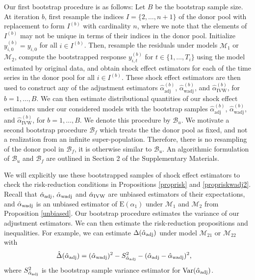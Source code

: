 \documentclass[11pt,3p,review,authoryear]{elsarticle}
\def\mrm#1{\mathrm{#1}} %
\def\mc#1{\mathcal{#1}} %
\def\E#1{\mathrm{E}(#1)} %
\DeclareMathOperator{\Var}{Var} %
\theoremstyle{definition}
\begin{document}
Our first bootstrap procedure is as follows: Let $B$ be the bootstrap sample size. At iteration $b$, first resample the indices $I = \{2, \ldots, n+1\}$ of the donor pool with replacement to form $I^{(b)}$ with cardinality $n$, where we note that the elements of $I^{(b)}$ may not be unique in terms of their  indices in the donor pool. Initialize $y_{i,0}^{(b)}=y_{i,0}$ for all $i \in I^{(b)}$. Then, resample the residuals under models $\mc{M}_1$ or $\mc{M}_{2}$, compute the bootstrapped response  $y_{i,t}^{(b)}$ for   $t \in \{1, \ldots, T_i\}$ using the model estimated by original data,  and obtain shock effect estimators for each of the time series in the donor pool for all $i \in I^{(b)}$. These shock effect estimators are then used to construct any of the adjustment estimators $\hat{\alpha}^{(b)}_{\mrm{adj}}$, $\hat{\alpha}^{(b)}_{\mrm{wadj}}$, and $\hat{\alpha}^{(b)}_{\mrm{IVW}}$, for $b = 1,\ldots,B$. We can then estimate distributional quantities of our shock effect estimators under our considered models with the bootstrap samples $\hat{\alpha}^{(b)}_{\mrm{adj}}$, $\hat{\alpha}^{(b)}_{\mrm{wadj}}$, and $\hat{\alpha}^{(b)}_{\mrm{IVW}}$, for $b = 1,\ldots,B$. We denote this procedure by $\mc{B}_u$. We motivate a second bootstrap procedure $\mc{B}_f$ which treats the the donor pool as fixed, and not a realization from an infinite super-population. Therefore, there is no resampling of the donor pool in $\mc{B}_f$, it is otherwise similar to $\mc{B}_u$. An algorithmic formulation of $\mc{B}_u$ and $\mc{B}_f$  are outlined in Section 2 of the Supplementary Materials.

We will explicitly use these bootstrapped samples of shock effect estimators to check the risk-reduction conditions in Propositions \ref{proprisk} and \ref{propriskwadj2}. Recall that $\hat{\alpha}_{\rm adj}$,  $\hat{\alpha}_{\rm wadj}$ and $\hat{\alpha}_{\rm IVW}$ are unbiased estimators of their expectations, and $\hat{\alpha}_{\rm wadj}$ is an unbiased estimator of $\E{\alpha_1}$ under $\mc{M}_1$ and $\mc{M}_2$ from Proposition \ref{unbiased}. Our bootstrap procedure estimates the variance of our adjustment estimators. We can then estimate the risk-reduction propositions and inequalities. For example, we can estimate $\Delta(\hat{\alpha}_{\rm adj})$ under model $\mc{M}_{21}$ or $\mc{M}_{22}$ with 
\begin{align*}
  \hat{\Delta}(\hat{\alpha}_{\rm adj}) & = (\hat{\alpha}_{\rm wadj})^2 -S^2_{\hat{\alpha}_{\rm adj}} -(\hat{\alpha}_{\rm adj}-\hat{\alpha}_{\rm wadj})^2,
\end{align*}
where $S^2_{\hat{\alpha}_{\rm adj}}$ is the bootstrap sample variance estimator for $\Var(\hat{\alpha}_{\rm adj})$. 
\end{document}
